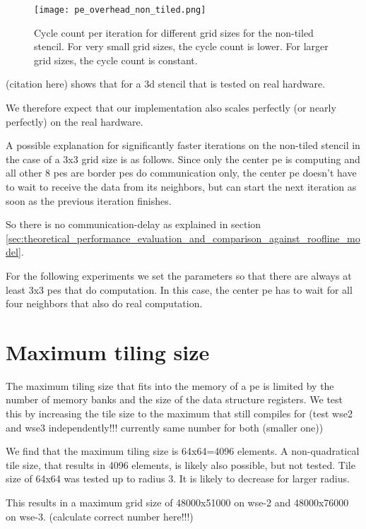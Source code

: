\begin{figure}[h]
    \centering
    \texttt{[image: pe\_overhead\_non\_tiled.png]}
    \caption{Cycle count per iteration for different grid sizes for the non-tiled stencil. For very small grid sizes, the cycle count is lower. For larger grid sizes, the cycle count is constant.}
    \label{fig:pe_overhead}
\end{figure}

(citation here) shows that for a 3d stencil that is tested on real hardware.

We therefore expect that our implementation also scales perfectly (or nearly perfectly) on the real hardware.

A possible explanation for significantly faster iterations on the non-tiled stencil in the case of a 3x3 grid size is as follows. Since only the center \ac{pe} is computing and all other 8 \acp{pe} are border \acp{pe} do communication only, the center \ac{pe} doesn't have to wait to receive the data from its neighbors, but can start the next iteration as soon as the previous iteration finishes.

So there is no communication-delay as explained in section \ref{sec:theoretical_performance_evaluation_and_comparison_against_roofline_model}.

For the following experiments we set the parameters so that there are always at least 3x3 \acp{pe} that do computation. In this case, the center \ac{pe} has to wait for all four neighbors that also do real computation.

\section{Maximum tiling size}
The maximum tiling size that fits into the memory of a \ac{pe} is limited by the number of memory banks and the size of the data structure registers.
We test this by increasing the tile size to the maximum that still compiles for (test wse2 and wse3 independently!!! currently same number for both (smaller one))

We find that the maximum tiling size  is 64x64=4096 elements.
A non-quadratical tile size, that results in 4096 elements, is likely also possible, but not tested.
Tile size of 64x64 was tested up to radius 3. It is likely to decrease for larger radius.

This results in a maximum grid size of 48000x51000 on wse-2 and 48000x76000 on wse-3. (calculate correct number here!!!)

